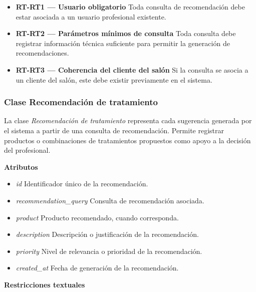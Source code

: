 \begin{itemize}

      \item \textbf{RT-RT1 — Usuario obligatorio}
            Toda consulta de recomendación debe estar asociada a un usuario profesional existente.
      \item \textbf{RT-RT2 — Parámetros mínimos de consulta}
            Toda consulta debe registrar información técnica suficiente para permitir la generación de recomendaciones.
      \item \textbf{RT-RT3 — Coherencia del cliente del salón}
            Si la consulta se asocia a un cliente del salón, este debe existir previamente en el sistema.

\end{itemize}

\subsubsection{Clase Recomendación de tratamiento}

La clase \textit{Recomendación de tratamiento} representa cada sugerencia generada por el sistema a partir de una consulta de recomendación. Permite registrar productos o combinaciones de tratamientos propuestos como apoyo a la decisión del profesional.

\textbf{Atributos}

\begin{itemize}

      \item \textit{id}
            Identificador único de la recomendación.
      \item \textit{recommendation\_query}
            Consulta de recomendación asociada.
      \item \textit{product}
            Producto recomendado, cuando corresponda.
      \item \textit{description}
            Descripción o justificación de la recomendación.
      \item \textit{priority}
            Nivel de relevancia o prioridad de la recomendación.
      \item \textit{created\_at}
            Fecha de generación de la recomendación.

\end{itemize}

\textbf{Restricciones textuales}

